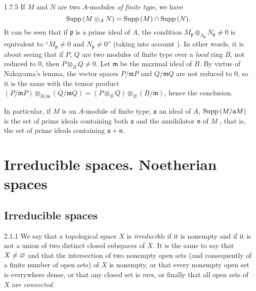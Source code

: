 \begin{env}{1.7.5}
\label{env-0.1.7.5}
If $M$ and $N$ are two $A$-modules \emph{of finite type}, we have
\[
  {\mathop{\mathrm{Supp}}\nolimits}\,(M\otimes_A N)={\mathop{\mathrm{Supp}}\nolimits}\,(M)\cap{\mathop{\mathrm{Supp}}\nolimits}\,(N).
\]
It can be seen that if $\mathfrak{p}$ is a prime ideal of $A$, the condition
$M_\mathfrak{p}\otimes_{A_\mathfrak{p}}N_\mathfrak{p}\neq 0$ is equivalent to
``$M_\mathfrak{p}\neq 0$ and $N_\mathfrak{p}\neq 0$'' (taking into account
). In other words, it is about seeing that if $P$, $Q$ are two modules of
finite type over a \emph{local} ring $B$, not reduced to $0$, then $P\otimes_B Q\neq 0$. Let
$\mathfrak{m}$ be the maximal ideal of $B$. By virtue of Nakayama's lemma, the vector spaces
$P/\mathfrak{m}P$ and $Q/\mathfrak{m}Q$ are not reduced to $0$, so it is the same with the
tensor product
$(P/\mathfrak{m}P)\otimes_{B/\mathfrak{m}}(Q/\mathfrak{m}Q)
  =(P\otimes_B Q)\otimes_B(B/\mathfrak{m})$,
hence the conclusion.

In particular, if $M$ is an $A$-module of finite type, $\mathfrak{a}$ an ideal of $A$,
${\mathop{\mathrm{Supp}}\nolimits}\,(M/\mathfrak{a}M)$ is the set of prime ideals containing both $\mathfrak{a}$ and the
annihilator $\mathfrak{n}$ of $M$ , that is, the set of prime ideals
containing $\mathfrak{a}+\mathfrak{n}$.
\end{env}

\section{Irreducible spaces. Noetherian spaces}
\label{0-prelim-2}

\subsection{Irreducible spaces}
\label{0-prelim-2.1}

\begin{env}{2.1.1}
\label{env-0.2.1.1}
We say that a topological space $X$ is \emph{irreducible} if it is nonempty and if it is not
a union of two distinct closed subspaces of $X$. It is the same to say that $X\neq\varnothing$ and
that the intersection of two nonempty open sets (and consequently of a finite number of open
sets) of $X$ is nonempty, or that every nonempty open set is everywhere dense, or that any
closed set is \emph{rare}, or finally that all open sets of $X$ are \emph{connected}.
\end{env}

